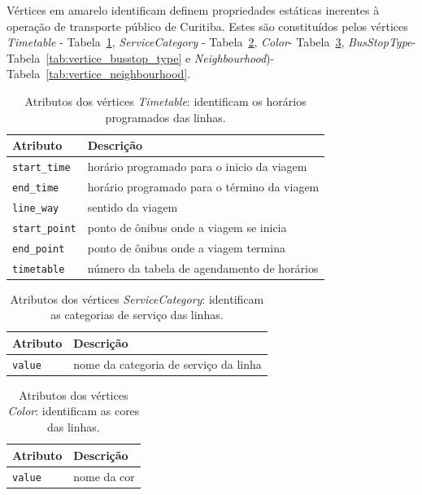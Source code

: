 Vértices em amarelo identificam definem propriedades estáticas inerentes à operação de transporte público de Curitiba. Estes são constituídos pelos vértices \emph{Timetable} - Tabela~\ref{tab:vertice_timetable}, \emph{ServiceCategory} - Tabela~\ref{tab:vertice_service_category}, \emph{Color}- Tabela~\ref{tab:vertice_color}, \emph{BusStopType}- Tabela~\ref{tab:vertice_busstop_type} e \emph{Neighbourhood})- Tabela~\ref{tab:vertice_neighbourhood}.
 

\begin{table}[htb]
    \caption{Atributos dos vértices \emph{Timetable}: identificam os horários programados das linhas.}
    \label{tab:vertice_timetable}
    \centering
    \footnotesize
    \begin{tabular}{p{2.5cm}p{6.5cm}}
        \hline
        Atributo & Descrição\\
        \hline
        \texttt{start\_time} & horário programado para o inicio da viagem \\
        \texttt{end\_time} & horário programado para o término da viagem \\
        \texttt{line\_way} & sentido da viagem \\
        \texttt{start\_point} & ponto de ônibus onde a viagem se inicia \\
        \texttt{end\_point} & ponto de ônibus onde a viagem termina \\
        \texttt{timetable} & número da tabela de agendamento de horários \\
        \hline  
    \end{tabular}
\end{table}

\begin{table}[htb]
    \caption{Atributos dos vértices \emph{ServiceCategory}: identificam as categorias de serviço das linhas.}
    \label{tab:vertice_service_category}
    \centering
    \footnotesize
    \begin{tabular}{p{2.5cm}p{6.5cm}}
        \hline
        Atributo & Descrição\\
        \hline
        \texttt{value} & nome da categoria de serviço da linha \\
        \hline  
    \end{tabular}
\end{table}

\begin{table}[htb]
    \caption{Atributos dos vértices \emph{Color}: identificam as cores das linhas.}
    \label{tab:vertice_color}
    \centering
    \footnotesize
    \begin{tabular}{p{2.5cm}p{6.5cm}}
        \hline
        Atributo & Descrição\\
        \hline
        \texttt{value} & nome da cor \\
        \hline  
    \end{tabular}
\end{table}

